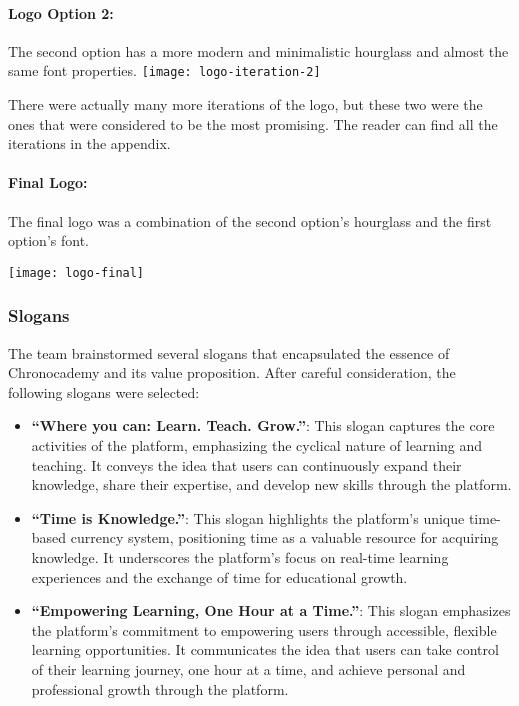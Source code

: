 \paragraph{Logo Option 2:} The second option has a more modern and minimalistic hourglass and almost the same font properties.\newline
\texttt{[image: logo-iteration-2]}\newline

There were actually many more iterations of the logo, but these two were the ones that were considered to be the most promising.
The reader can find all the iterations in the appendix.

\paragraph{Final Logo:} The final logo was a combination of the second option's hourglass and the first option's font.\newline
\begin{center}
    \texttt{[image: logo-final]}
\end{center}

\subsubsection{Slogans}\label{subsubsec:slogans}
The team brainstormed several slogans that encapsulated the essence of Chronocademy and its value proposition.
After careful consideration, the following slogans were selected:
\begin{itemize}
    \item \textbf{``Where you can: Learn. Teach. Grow.''}: This slogan captures the core activities of the platform, emphasizing the cyclical nature of learning and teaching.
    It conveys the idea that users can continuously expand their knowledge, share their expertise, and develop new skills through the platform.
    \item \textbf{``Time is Knowledge.''}: This slogan highlights the platform’s unique time-based currency system, positioning time as a valuable resource for acquiring knowledge.
    It underscores the platform’s focus on real-time learning experiences and the exchange of time for educational growth.
    \item \textbf{``Empowering Learning, One Hour at a Time.''}: This slogan emphasizes the platform’s commitment to empowering users through accessible, flexible learning opportunities.
    It communicates the idea that users can take control of their learning journey, one hour at a time, and achieve personal and professional growth through the platform.

\end{itemize}

